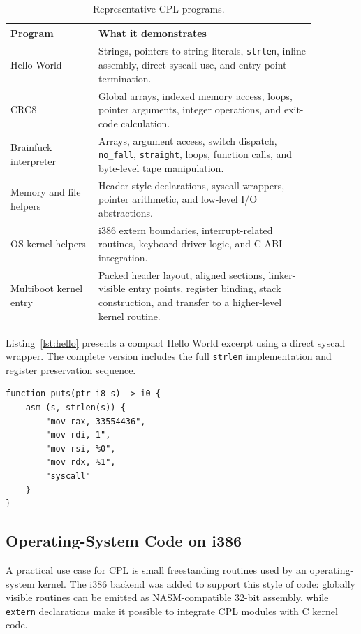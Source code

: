 \documentclass[10pt,twocolumn]{article}
\begin{document}
\begin{table}[htbp]
\centering
\caption{Representative CPL programs.}
\begin{tabular}{p{0.25\linewidth}p{0.62\linewidth}}
\toprule
Program & What it demonstrates \\
\midrule
Hello World & Strings, pointers to string literals, \texttt{strlen}, inline assembly, direct syscall use, and entry-point termination. \\
CRC8 & Global arrays, indexed memory access, loops, pointer arguments, integer operations, and exit-code calculation. \\
Brainfuck interpreter & Arrays, argument access, switch dispatch, \texttt{no\_fall}, \texttt{straight}, loops, function calls, and byte-level tape manipulation. \\
Memory and file helpers & Header-style declarations, syscall wrappers, pointer arithmetic, and low-level I/O abstractions. \\
OS kernel helpers & i386 extern boundaries, interrupt-related routines, keyboard-driver logic, and C ABI integration. \\
Multiboot kernel entry & Packed header layout, aligned sections, linker-visible entry points, register binding, stack construction, and transfer to a higher-level kernel routine. \\
\bottomrule
\end{tabular}
\end{table}

\par Listing~\ref{lst:hello} presents a compact Hello World excerpt using a direct syscall wrapper. The complete version includes the full \texttt{strlen} implementation and register preservation sequence.

\begin{lstlisting}[language=CPL,caption={Shortened Hello World with explicit syscall wrapper.},label={lst:hello}]
function puts(ptr i8 s) -> i0 {
    asm (s, strlen(s)) {
        "mov rax, 33554436",
        "mov rdi, 1",
        "mov rsi, %0",
        "mov rdx, %1",
        "syscall"
    }
}
\end{lstlisting}

\subsection{Operating-System Code on i386}

\par A practical use case for CPL is small freestanding routines used by an operating-system kernel. The i386 backend was added to support this style of code: globally visible routines can be emitted as NASM-compatible 32-bit assembly, while \texttt{extern} declarations make it possible to integrate CPL modules with C kernel code.
\end{document}
